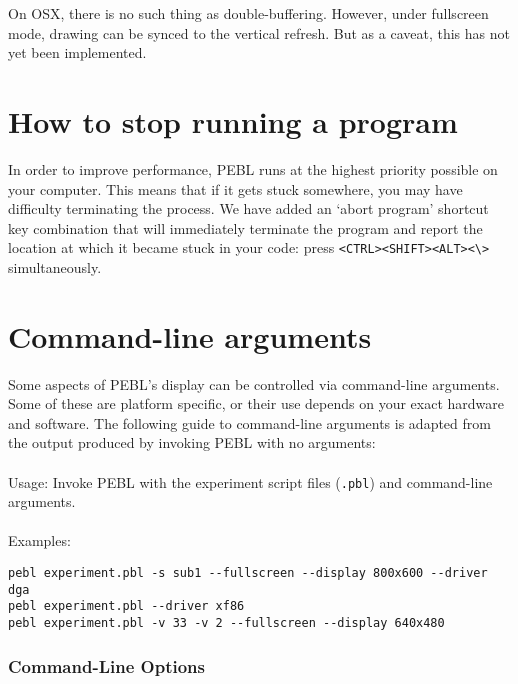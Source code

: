 On OSX, there is no such thing as double-buffering.  However, under
fullscreen mode, drawing can be synced to the vertical refresh. But as
a caveat, this has not yet been implemented.

\section{How to stop running a program}

In order to improve performance, PEBL runs at the highest
priority possible on your computer.  This means that if it
gets stuck somewhere, you may have difficulty terminating the
process.  We have added an `abort program' shortcut key
combination that will immediately terminate the program and
report the location at which it became stuck in your code: \newline press \verb+<CTRL><SHIFT><ALT><\>+ simultaneously.
  

\section{Command-line arguments}
\label{sec:2.5}
Some aspects of PEBL's display can be controlled via
command-line arguments.  Some of these are platform
specific, or their use depends on your exact hardware and
software. The following guide to command-line
arguments is adapted from the output produced by
invoking PEBL  with no arguments:\\
\\
Usage:  Invoke PEBL with the experiment script files (\texttt{.pbl})
and  command-line arguments.\\
\\
Examples:
\begin{verbatim}
pebl experiment.pbl -s sub1 --fullscreen --display 800x600 --driver dga
pebl experiment.pbl --driver xf86
pebl experiment.pbl -v 33 -v 2 --fullscreen --display 640x480 
\end{verbatim}
 

\subsubsection{Command-Line Options}


